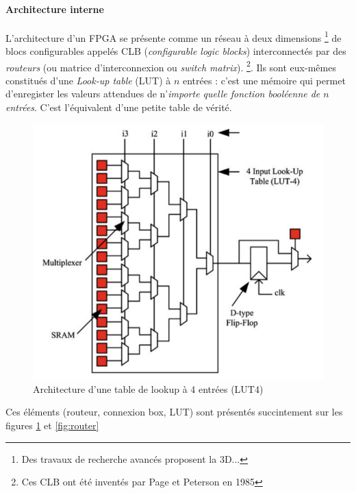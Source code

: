\paragraph{Architecture interne}
L'architecture d'un FPGA se présente comme un réseau à deux dimensions \footnote{Des travaux de recherche avancés proposent la 3D...}
de blocs configurables appelés CLB (\textit{configurable logic blocks}) interconnectés par des \textit{routeurs} (ou matrice d'interconnexion ou \textit{switch matrix}).
\footnote{Ces CLB ont été inventés par Page et Peterson en  1985}. Ils sont eux-mêmes constitués d'une \textit{Look-up table} (LUT) à $n$ entrées : c'est une mémoire
qui permet d'enregister les valeurs attendues de n'\textit{importe quelle fonction booléenne de $n$ entrées}. C'est l'équivalent d'une petite table de vérité.


\begin{figure}[h!]
  \centering
  \includegraphics[scale=0.4]{./figures/LUT4.png}
  \caption{Architecture d'une table de lookup à 4 entrées (LUT4)}
  \label{fig:lut4}
\end{figure}

Ces éléments (routeur, connexion box, LUT) sont présentés succintement sur les figures \ref{fig:lut4} et \ref{fig:router}

